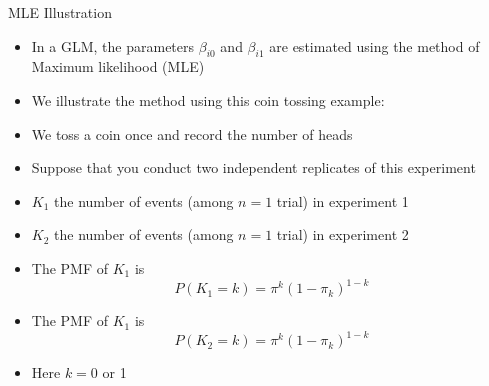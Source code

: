 \documentclass[xcolor=x11names,compress]{beamer}\usepackage[]{graphicx}\usepackage[]{color}
\begin{document}
\begin{frame}{MLE Illustration}
  \begin{itemize}
  \item In a GLM, the parameters $\beta_{i0}$ and $\beta_{i1}$ are estimated using the
    method of Maximum likelihood (MLE)
  \item We illustrate the method using this coin tossing example:
  \item We toss a coin once and record the number of heads
  \item Suppose that you conduct two independent replicates of this experiment
  \item $K_1$ the number of events (among $n=1$ trial) in experiment 1
  \item $K_2$ the number of events (among $n=1$ trial) in experiment 2
  \item The PMF of $K_1$ is
    \begin{equation*}
      P(K_1=k) = \pi^k (1-\pi_k)^{1-k}
    \end{equation*}
   \item The PMF of $K_1$ is
    \begin{equation*}
      P(K_2=k) = \pi^k (1-\pi_k)^{1-k}
    \end{equation*}
   \item Here $k=0$ or 1
  \end{itemize}
\end{frame}


\end{document}
